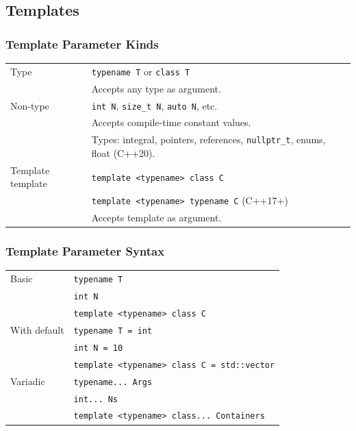 \subsection{Templates}

\subsubsection{Template Parameter Kinds}

\begin{tabularx}{\linewidth}{lX}
    \hline
    Type & \texttt{typename T} or \texttt{class T}\\
         & Accepts any type as argument.\\
    \hline
    Non-type & \texttt{int N}, \texttt{size\_t N}, \texttt{auto N}, etc.\\
             & Accepts compile-time constant values.\\
             & Types: integral, pointers, references, \texttt{nullptr\_t}, enums, float (C++20).\\
    \hline
    Template template & \texttt{template <typename> class C}\\
                      & \texttt{template <typename> typename C} (C++17+)\\
                      & Accepts template as argument.\\
    \hline
\end{tabularx}

\subsubsection{Template Parameter Syntax}

\begin{tabularx}{\linewidth}{lX}
    \hline
    Basic & \texttt{typename T}\\
          & \texttt{int N}\\
          & \texttt{template <typename> class C}\\
    \hline
    With default & \texttt{typename T = int}\\
                 & \texttt{int N = 10}\\
                 & \texttt{template <typename> class C = std::vector}\\
    \hline
    Variadic & \texttt{typename... Args}\\
             & \texttt{int... Ns}\\
             & \texttt{template <typename> class... Containers}\\
    \hline
\end{tabularx}

